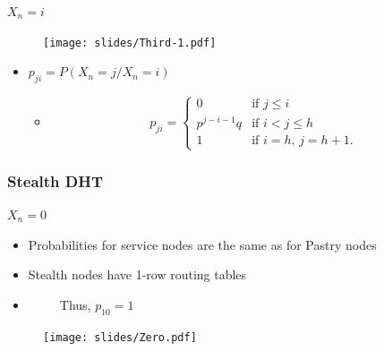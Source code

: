 \documentclass[xcolor=pdftex,dvipsnames,table]{beamer}
\begin{document}
\begin{frame}
\begin{block}{$X_n= i$}
  \begin{center}
    \begin{figure}%
        \texttt{[image: slides/Third-1.pdf]}
    \end{figure}
  \end{center}
\end{block}
\begin{block}{}
   \begin{itemize}
   \item \textbf{$p_{ji} = P(X_n = j/X_n = i)$}
     \begin{itemize}
     \item[] \[ p_{ji} = \left\{ \begin{array}{ll}
         0 & \mbox{if $j \le i$}\\
         p^{j-i-1}q & \mbox{if $i < j \le h$} \\
         1   &  \mbox{if $i = h$, $j=h+1$}
         .\end{array} \right. \]
     \end{itemize}
   \end{itemize}
   \end{block}
\end{frame}



\begin{frame}
\frametitle{Stealth DHT}
\begin{block}{$X_n= 0$}
   \begin{itemize}
        \item Probabilities for service nodes are the same as for Pastry
        nodes
        \item Stealth nodes have 1-row routing tables
        \item[]~~~~~Thus, $p_{10} = 1$
   \end{itemize}
\end{block}
\begin{block}{}
  \begin{center}
    \begin{figure}%
        \texttt{[image: slides/Zero.pdf]}
    \end{figure}
  \end{center}
\end{block}
\end{frame}
\end{document}
